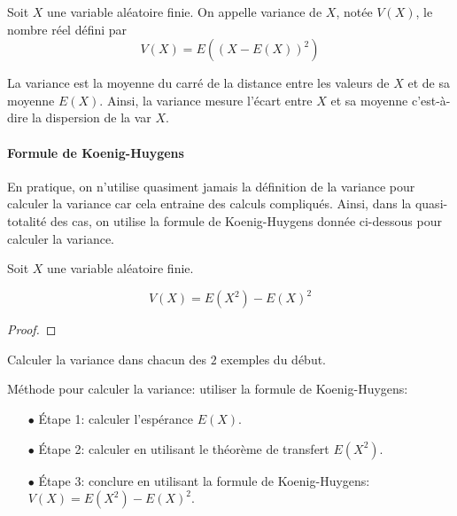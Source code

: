 \documentclass[a4paper, 11pt]{article}
\begin{document}
 {  

\begin{defi} 
Soit $X$ une variable al\'eatoire finie. 
 On appelle variance de $X$, not\'ee $V(X)$, le nombre r\'eel d\'efini par
$$V(X) = E( (X-E(X))^2)$$


\end{defi}
 
}

\begin{rem}
La variance est la moyenne du carr\'e de la distance entre les valeurs de $X$ et de sa moyenne $E(X)$. Ainsi, la variance mesure l'\'ecart entre $X$ et sa moyenne c'est-\`a-dire la dispersion de la var $X$.
\end{rem}


%
 
\paragraph{Formule de Koenig-Huygens}

 En pratique, on n'utilise quasiment jamais la d\'efinition de la variance pour calculer la variance car cela entraine des calculs compliqu\'es. Ainsi, dans la quasi-totalit\'e des cas, on utilise la formule de Koenig-Huygens donn\'ee ci-dessous pour calculer la variance.\vsec\vsec


 {  

\begin{prop} 
Soit $X$ une variable al\'eatoire finie. 

$$V(X) = E(X^2) - E(X)^2$$

\end{prop}
 
}



\begin{proof}


\end{proof}

\begin{exemple}
Calculer la variance dans chacun des $2$ exemples du d\'ebut.
\end{exemple}\vsec\vsec

\setlength\fboxrule{1pt}
  {

M\'ethode pour calculer la variance: utiliser la formule de Koenig-Huygens:
\begin{itemize}
\item[$\bullet$] \'Etape 1: calculer l'esp\'erance $E(X)$.
\item[$\bullet$] \'Etape 2: calculer en utilisant le th\'eor\`{e}me de transfert $E(X^2)$.
\item[$\bullet$] \'Etape 3: conclure en utilisant la formule de Koenig-Huygens: $V(X)=E(X^2)-E(X)^2$.
\end{itemize}
 }
\setlength\fboxrule{0.5pt}
\end{document}
